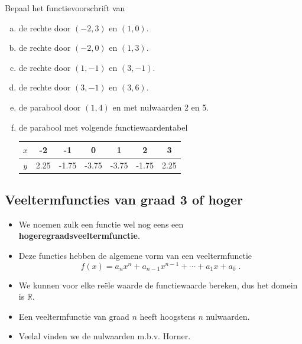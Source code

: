 \documentclass[12pt]{article}
\begin{document}
\begin{oefening}
Bepaal het functievoorschrift van
\begin{enumerate}[(a)]
  \itemsep.5em
  \item de rechte door $(-2, 3)$ en $(1, 0)$.
  \item de rechte door $(-2, 0)$ en $(1, 3)$.
  \item de rechte door $(1, -1)$ en $(3, -1)$.
  \item de rechte door $(3, -1)$ en $(3, 6)$.
  \item de parabool door $(1,4)$ en met nulwaarden 2 en 5.
  \item de parabool met volgende functiewaardentabel
  \begin{center}
    \begin{tabular}{c|cccccc}
    $x$ & -2 & -1 & 0 & 1 & 2 & 3\\
    \hline
    $y$ & 2.25 & -1.75 & -3.75 & -3.75 & -1.75 & 2.25
    \end{tabular}
  \end{center}
\end{enumerate}
\end{oefening}



\pagebreak
\subsection{Veeltermfuncties van graad 3 of hoger}

\begin{itemize}
\item We noemen zulk een functie wel nog eens een {\bf hogeregraadsveeltermfunctie}.
\item Deze functies hebben de algemene vorm van een veeltermfunctie
  $$f(x)= a_nx^n + a_{n-1}x^{n-1} + \cdots + a_1x + a_0\;.$$
\item We kunnen voor elke reële waarde de functiewaarde bereken, dus het domein is $\mathbb{R}$.
\item Een veeltermfunctie van graad $n$ heeft hoogstens $n$ nulwaarden.
\item Veelal vinden we de nulwaarden m.b.v. Horner.
\end{itemize}
\end{document}
